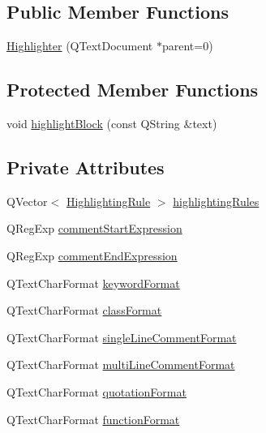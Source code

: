 \subsection*{Public Member Functions}
\begin{DoxyCompactItemize}
\item 
\hyperlink{class_highlighter_af9fa54a58a9365e91e5f8eccf22f5153}{Highlighter} (Q\-Text\-Document $\ast$parent=0)
\end{DoxyCompactItemize}
\subsection*{Protected Member Functions}
\begin{DoxyCompactItemize}
\item 
void \hyperlink{class_highlighter_ad07c7fd55d2ce2c675bca607b9370488}{highlight\-Block} (const Q\-String \&text)
\end{DoxyCompactItemize}
\subsection*{Private Attributes}
\begin{DoxyCompactItemize}
\item 
Q\-Vector$<$ \hyperlink{struct_highlighter_1_1_highlighting_rule}{Highlighting\-Rule} $>$ \hyperlink{class_highlighter_aa23f8b3f4ddd1354f508b46d77897fe5}{highlighting\-Rules}
\item 
Q\-Reg\-Exp \hyperlink{class_highlighter_a67cdecd667929b4eefbc7057d58cd90b}{comment\-Start\-Expression}
\item 
Q\-Reg\-Exp \hyperlink{class_highlighter_a3baa1033bbdf70a16df42940968b72b4}{comment\-End\-Expression}
\item 
Q\-Text\-Char\-Format \hyperlink{class_highlighter_acf807339a8cd02097a81e455ef2686d2}{keyword\-Format}
\item 
Q\-Text\-Char\-Format \hyperlink{class_highlighter_a765a13081aa25d818c766b7f8e50f454}{class\-Format}
\item 
Q\-Text\-Char\-Format \hyperlink{class_highlighter_ad1ca0f6942b0451781d7e32f1781f22b}{single\-Line\-Comment\-Format}
\item 
Q\-Text\-Char\-Format \hyperlink{class_highlighter_ad4661760f22cf913b696ec90dea994c0}{multi\-Line\-Comment\-Format}
\item 
Q\-Text\-Char\-Format \hyperlink{class_highlighter_a3d4bf96c8ea27ba18bca4adc6b306db8}{quotation\-Format}
\item 
Q\-Text\-Char\-Format \hyperlink{class_highlighter_a7e02cd8caee678c1256998c88d30e241}{function\-Format}
\end{DoxyCompactItemize}


